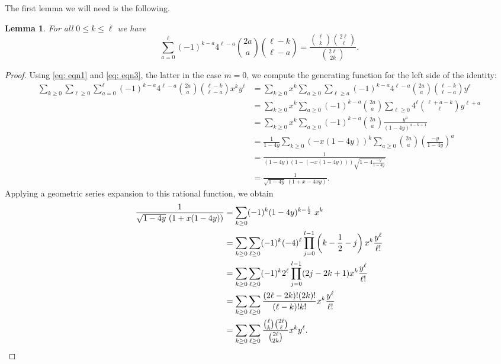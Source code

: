 \documentclass{amsart}
\numberwithin{equation}{section}
\theoremstyle{plain}
\newtheorem{lem}[thm]{Lemma}
\theoremstyle{definition}
\begin{document}
The first lemma we will need is the following.
\begin{lem}\label{hodai1}
    For all $0 \leq k \leq \ell$ we have
    \[
        \sum_{a = 0}^\ell(-1)^{k-a}4^{\ell-a} \binom{2a}{a} \binom{\ell-k}{\ell-a} = \frac{\binom{\ell}{k} \binom{2\ell}{\ell}}{ \binom{2\ell}{2k}}.
    \]    
\end{lem}

\begin{proof}
    Using \eqref{eq: eqn1} and \eqref{eq: eqn3}, the latter in the case $m=0$, we compute the generating function for the left side of the identity:
    \[\begin{aligned}
        \sum_{k \ge 0} \sum_{\ell \ge0} \sum_{a = 0}^\ell(-1)^{k-a}4^{\ell-a}\binom{2a}{a} \binom{\ell-k}{\ell-a}x^k y^\ell
        &= \sum_{k \ge 0} x^k \sum_{a \ge 0}\sum_{\ell \ge a}(-1)^{k-a}4^{\ell-a} \binom{2a}{a} \binom{\ell-k}{\ell-a}y^\ell \\
        &= \sum_{k \ge 0} x^k \sum_{a \ge 0}(-1)^{k-a}\binom{2a}{a} \sum_{\ell \ge 0}4^{\ell}\binom{\ell+a-k}{\ell}y^{\ell+a}\\
        &=\sum_{k \ge 0} x^k \sum_{a \ge 0}(-1)^{k-a}\binom{2a}{a} \frac{y^a}{(1-4y)^{a-k+1}}\\
        &= \frac{1}{1-4y}\sum_{k \ge 0} \left(-x(1-4y)\right)^k\sum_{a \ge 0}\binom{2a}{a} \left(\frac{-y}{1-4y}\right)^a\\
        &= \frac{1}{(1-4y)(1-(-x(1-4y)))\sqrt{1-4 \frac{-y}{1-4y}}}\\
        &= \frac{1}{\sqrt{1-4y} \ (1+x-4xy)}.
    \end{aligned}\]
Applying a geometric series expansion to this rational function, we obtain
\begin{align*}
\frac{1}{\sqrt{1-4y} \ (1+x(1-4y))}
&=
\sum_{k\ge 0} (-1)^k (1-4y)^{k-\frac{1}{2}} \ x^k\\
&=
\sum_{k \ge 0} \sum_{\ell \ge 0} 
(-1)^k 
(-4)^\ell 
\prod_{j=0}^{l-1} \left(k - \frac{1}{2} - j\right)
x^k \frac{y^\ell}{\ell !}\\
&=
\sum_{k \ge 0} \sum_{\ell \ge 0} 
(-1)^k 
2^\ell 
\prod_{j=0}^{l-1} (2j-2k+1)
x^k \frac{y^\ell}{\ell !}\\
&=
\sum_{k \ge 0} \sum_{\ell \ge 0} 
\frac{(2\ell-2k)! (2k)!}{(\ell -k)! k!}
x^k \frac{y^\ell}{\ell !}\\
&=
\sum_{k \ge 0} \sum_{\ell \ge 0} 
\frac{\binom{\ell}{k} \binom{2\ell}{\ell}}{ \binom{2\ell}{2k}}
x^k  y^\ell.\qedhere
\end{align*}
\end{proof}
\end{document}
